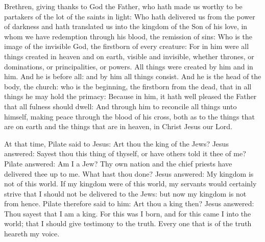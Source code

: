 \begin{multicols}{2}
Brethren, giving thanks to God the Father, who hath made us worthy to be
partakers of the lot of the saints in light:
Who hath delivered us from the power of darkness and hath
translated us into the kingdom of the Son of his love,
in whom we have redemption through his blood, the remission of
sins:
Who is the image of the invisible God, the firstborn of every
creature:
For in him were all things created in heaven and on earth, visible
and invisible, whether thrones, or dominations, or principalities, or
powers. All things were created by him and in him.
And he is before all: and by him all things consist.
And he is the head of the body, the church: who is the beginning,
the firstborn from the dead, that in all things he may hold the primacy:
Because in him, it hath well pleased the Father that all fulness
should dwell:
And through him to reconcile all things unto himself, making peace
through the blood of his cross, both as to the things that are on earth
and the things that are in heaven, in Christ Jesus our Lord.



At that time, Pilate %
said to Jesus: Art thou the king of the Jews?
Jesus answered: Sayest thou this thing of thyself, or have others
told it thee of me?
Pilate answered: Am I a Jew? Thy own nation and the chief priests
have delivered thee up to me. What hast thou done?
Jesus answered: My kingdom is not of this world. If my kingdom
were of this world, my servants would certainly strive that I should not
be delivered to the Jews: but now my kingdom is not from hence.
Pilate therefore said to him: Art thou a king then? Jesus
answered: Thou sayest that I am a king. For this was I born, and for
this came I into the world; that I should give testimony to the truth.
Every one that is of the truth heareth my voice.


\bigskip





\end{multicols}
